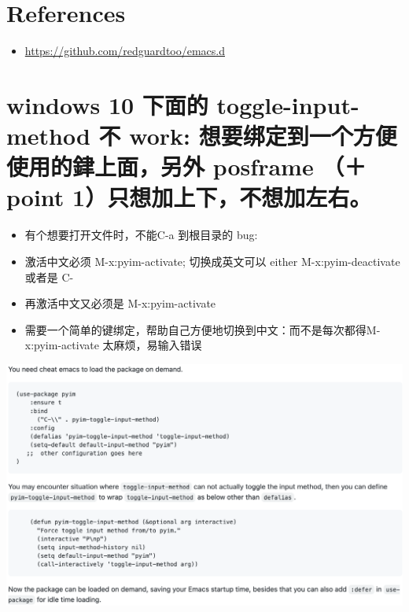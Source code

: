 \documentclass[9pt, b5paper]{article}
\begin{document}
\section{References}
\label{sec-3}
\begin{itemize}
\item \url{https://github.com/redguardtoo/emacs.d}
\end{itemize}

\section{windows 10 下面的 toggle-input-method 不 work: 想要绑定到一个方便使用的銉上面，另外 posframe （＋ point 1）只想加上下，不想加左右。}
\label{sec-4}
\begin{itemize}
\item 有个想要打开文件时，不能C-a 到根目录的 bug:
\item 激活中文必须 M-x:pyim-activate; 切换成英文可以 either M-x:pyim-deactivate 或者是 C-\\
\item 再激活中文又必须是 M-x:pyim-activate
\item 需要一个简单的键绑定，帮助自己方便地切换到中文：而不是每次都得M-x:pyim-activate 太麻烦，易输入错误
\end{itemize}

\includegraphics[width=.9\linewidth]{./pic/readme_20230226_130117.png}
\end{document}
